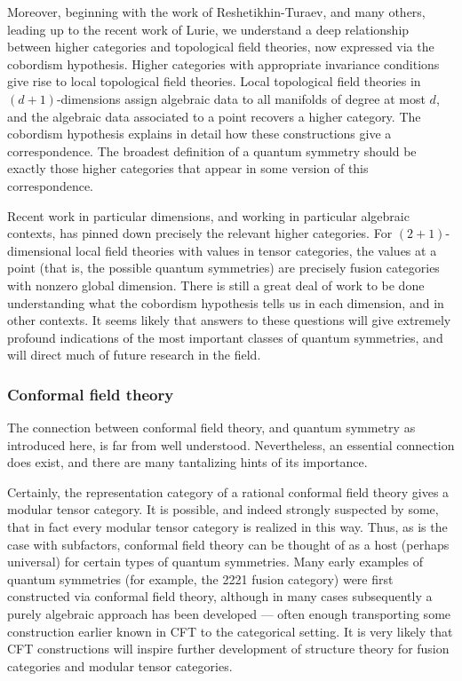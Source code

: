 \documentclass[11pt]{article}
\begin{document}
Moreover, beginning with the work of Reshetikhin-Turaev, and many others, leading up to the recent work of Lurie, we understand a deep relationship between higher categories and  topological field theories, now expressed via the cobordism hypothesis. Higher categories with appropriate invariance conditions give rise to local topological field theories. Local topological field theories in $(d+1)$-dimensions assign algebraic data to all manifolds of degree at most $d$, and the algebraic data associated to a point recovers a higher category. The cobordism hypothesis explains in detail how these constructions give a correspondence. The broadest definition of a quantum symmetry should be exactly those higher categories that appear in some version of this correspondence.

Recent work in particular dimensions, and working in particular algebraic contexts, has pinned down precisely the relevant higher categories. For $(2+1)$-dimensional local field theories with values in tensor categories, the values at a point (that is, the possible quantum symmetries) are precisely fusion categories with nonzero global dimension. There is still a great deal of work
to be done understanding what the cobordism hypothesis tells us in each dimension, and in other contexts. It seems likely that answers to these questions will give extremely profound indications of the most important classes of quantum symmetries, and will direct much of future research in the field.

\subsubsection{Conformal field theory}

The connection between conformal field theory, and quantum symmetry as introduced here, is far from well understood. Nevertheless, an essential connection does exist, and there are many tantalizing hints of its importance.

Certainly, the representation category of a rational conformal field theory gives a modular tensor category. It is possible, and indeed strongly suspected by some, that in fact every modular tensor category is realized in this way.
Thus, as is the case with subfactors, conformal field theory can be thought of
as a host (perhaps universal) for certain types of quantum symmetries. Many early examples of quantum symmetries (for example, the 2221 fusion category) were first constructed via conformal field theory, although in many cases subsequently a purely algebraic approach has been developed --- often enough
transporting some construction earlier known in CFT to the categorical
setting. It is very likely that CFT constructions will inspire further
development of structure theory for fusion categories and modular tensor
categories.
\end{document}
